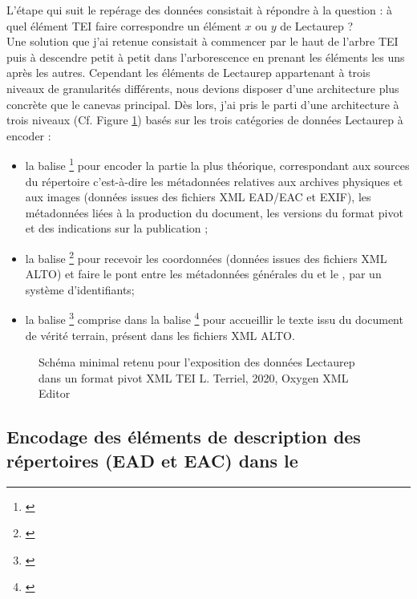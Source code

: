 L'étape qui suit le repérage des données consistait à répondre à la question : à quel élément TEI faire correspondre un élément $x$ ou $y$ de Lectaurep ?\\ 

Une solution que j'ai retenue consistait à commencer par le haut de l'arbre TEI puis à descendre petit à petit dans l'arborescence en prenant les éléments les uns après les autres. Cependant les éléments de Lectaurep appartenant à trois niveaux de granularités différents, nous devions disposer d'une architecture plus concrète que le canevas  principal. Dès lors, j'ai pris le parti d'une  architecture à trois niveaux (Cf. Figure \ref{fig:structure_general_template_tei_lectaurep}) basés sur les trois catégories de données Lectaurep à encoder : 
\begin{itemize}
    \item la balise \footnote{\cite{tei_tei_nodate}} pour encoder la partie la plus théorique, correspondant aux sources du répertoire c'est-à-dire les métadonnées relatives aux archives physiques et aux images (données issues des fichiers XML EAD/EAC et EXIF), les métadonnées liées à la production du document, les versions du format pivot et des indications sur la publication ;
    \item la balise \footnote{\cite{tei_tei_nodate-2}} pour recevoir les coordonnées (données issues des fichiers XML ALTO) et faire le pont entre les métadonnées générales du  et le , par un système d'identifiants;
    \item la balise \footnote{\cite{tei_tei_nodate-3}} comprise dans la balise \footnote{\cite{tei_tei_nodate-1}} pour accueillir le texte issu du document de vérité terrain, présent dans les fichiers XML ALTO.
\end{itemize}

\begin{figure}[h]
    \centering
    \centerline{}
    \caption{Schéma minimal retenu pour l'exposition des données Lectaurep dans un format pivot XML TEI \textcopyright L. Terriel, 2020, Oxygen XML Editor}
    \label{fig:structure_general_template_tei_lectaurep}
\end{figure}
\newpage

\subsection{Encodage des éléments de description des répertoires (EAD et EAC) dans le }

